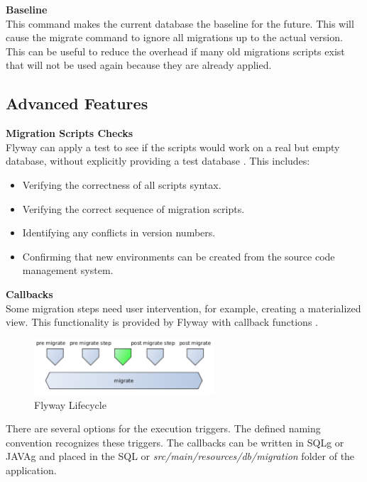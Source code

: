 \textbf{Baseline}\\
This command makes the current database the baseline for the future. This will cause the migrate command to ignore all migrations up to the actual version. This can be useful to reduce the overhead if many old migrations scripts exist that will not be used again because they are already applied.

\subsection{Advanced Features}
\textbf{Migration Scripts Checks}\\
Flyway can apply a test to see if the scripts would work on a real but empty database, without explicitly providing a test database \cite{FlywayChecks}. This includes:
\begin{itemize}
	\item Verifying the correctness of all scripts syntax.
	\item Verifying the correct sequence of migration scripts.
	\item Identifying any conflicts in version numbers.
	\item Confirming that new environments can be created from the source code management system.
\end{itemize}

\textbf{Callbacks}\\
Some migration steps need user intervention, for example, creating a materialized view. This functionality is provided by Flyway with callback functions \cite{Parsick2018}. 

\begin{figure}[H]
	\centering
	\includegraphics[width=0.6\textwidth]{./chapters/intro_flyway/images/advanced_migrations}
	\caption[Flyway Lifecycle - Source: \cite{Parsick2018}]{Flyway Lifecycle}
	\label{fig:advanced_migrations}
\end{figure}

There are several options for the execution triggers. The defined naming convention recognizes these triggers. The callbacks can be written in \gls{SQLg} or \gls{JAVAg} and placed in the SQL or \textit{src/main/resources/db/migration} folder of the application.

